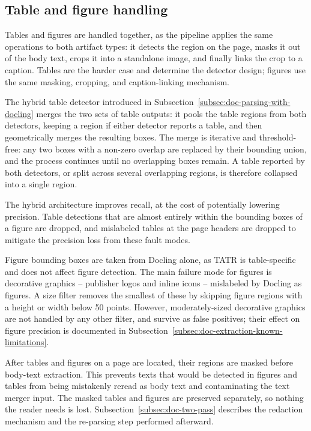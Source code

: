 \subsection{Table and figure handling}\label{subsec:doc-table-and-figure-handling}

Tables and figures are handled together, as the pipeline applies the same operations to both artifact types: it detects the region on the page, masks it out of the body text, crops it into a standalone image, and finally links the crop to a caption. Tables are the harder case and determine the detector design; figures use the same masking, cropping, and caption-linking mechanism.

The hybrid table detector introduced in Subsection~\ref{subsec:doc-parsing-with-docling} merges the two sets of table outputs: it pools the table regions from both detectors, keeping a region if either detector reports a table, and then geometrically merges the resulting boxes. The merge is iterative and threshold-free: any two boxes with a non-zero overlap are replaced by their bounding union, and the process continues until no overlapping boxes remain. A table reported by both detectors, or split across several overlapping regions, is therefore collapsed into a single region.

The hybrid architecture improves recall, at the cost of potentially lowering precision. Table detections that are almost entirely within the bounding boxes of a figure are dropped, and mislabeled tables at the page headers are dropped to mitigate the precision loss from these fault modes. 

Figure bounding boxes are taken from Docling alone, as TATR is table-specific and does not affect figure detection. The main failure mode for figures is decorative graphics -- publisher logos and inline icons -- mislabeled by Docling as figures. A size filter removes the smallest of these by skipping figure regions with a height or width below 50 points. However, moderately-sized decorative graphics are not handled by any other filter, and survive as false positives; their effect on figure precision is documented in Subsection~\ref{subsec:doc-extraction-known-limitations}.

After tables and figures on a page are located, their regions are masked before body-text extraction. This prevents texts that would be detected in figures and tables from being mistakenly reread as body text and contaminating the text merger input. The masked tables and figures are preserved separately, so nothing the reader needs is lost. Subsection~\ref{subsec:doc-two-pass} describes the redaction mechanism and the re-parsing step performed afterward.

